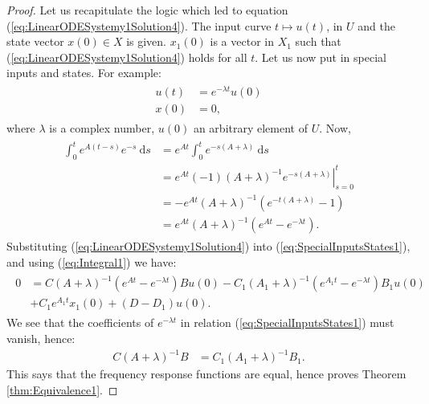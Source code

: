 \documentclass[12pt]{book}
\theoremstyle{plain}
\theoremstyle{definition}
\newcommand{\dd}[1]{\mathrm{d}#1}
\begin{document}
\begin{proof}
    Let us recapitulate the logic which led to equation (\ref{eq:LinearODESystemy1Solution4}).
    The input curve $t \mapsto u(t)$, in $U$ and the state vector $x(0) \in X$ is given.
    $x_1(0)$ is a vector in $X_1$ such that (\ref{eq:LinearODESystemy1Solution4}) holds for all $t$.
    Let us now put in special inputs and states.
    For example:
    \begin{align}
    \begin{split} \label{eq:SpecialInputsStates1}
        u(t) &= e^{-\lambda t}u(0) \\
        x(0) &= 0,
    \end{split}
    \end{align}
    where $\lambda$ is a complex number, $u(0)$ an arbitrary element of $U$.
    Now,
    \begin{align}
    \begin{split} \label{eq:Integral1}
        \int_0^t e^{A(t-s)}e^{-s}\ \dd{s} &= e^{At}\int_0^t e^{-s(A+\lambda)}\ \dd{s} \\
        &= \left.e^{At}(-1)(A+\lambda)^{-1}e^{-s(A+\lambda)}\right|_{s=0}^t \\
        &= -e^{At}(A+\lambda)^{-1}(e^{-t(A+\lambda)} - 1) \\
        &= e^{At}(A+\lambda)^{-1}(e^{At}-e^{-\lambda t}).
    \end{split}
    \end{align}
    Substituting (\ref{eq:LinearODESystemy1Solution4}) into (\ref{eq:SpecialInputsStates1}), and using (\ref{eq:Integral1}) we have:
    \begin{align}
    \begin{split}
        0 &= C(A+\lambda)^{-1}(e^{At}-e^{-\lambda t})Bu(0) - C_1(A_1+\lambda)^{-1}(e^{A_1t}-e^{-\lambda t})B_1u(0) \\
        &+ C_1e^{A_1t}x_1(0) + (D-D_1)u(0).
    \end{split}
    \end{align}
    We see that the coefficients of $e^{-\lambda t}$ in relation (\ref{eq:SpecialInputsStates1}) must vanish, hence:
    \begin{align}
        C(A+\lambda)^{-1}B &= C_1(A_1+\lambda)^{-1}B_1.
    \end{align}
    This says that the frequency response functions are equal, hence proves Theorem \ref{thm:Equivalence1}.
\end{proof}
\end{document}
